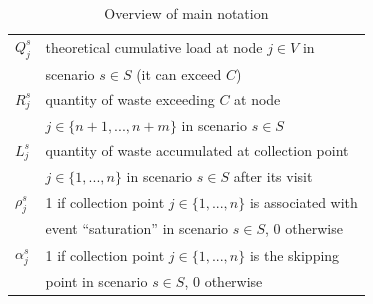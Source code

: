 \documentclass[preprint,11pt,authoryear]{elsarticle}
\begin{document}
\begin{table}[h!]
\begin{tabular}{ll}
$Q_j^s$ & theoretical cumulative load at node $j\in V$ in\\ & scenario $s \in S$ (it can exceed $C$)\\
$R_j^s$ & quantity of waste exceeding $C$ at node \\ & $j\in \{n+1,...,n+m\}$ in scenario $s \in S$\\
$L_j^s$ & quantity of waste accumulated at collection point \\ & $j\in \{1,...,n\}$ in scenario $s \in S$  after its visit \\
$\rho_j^s$ & 1 if collection point $j\in \{1,...,n\}$ is associated with \\ & event ``saturation'' in scenario $s\in S$, $0$ otherwise\\ 
$\alpha_j^s$ & 1 if collection point $j\in \{1,...,n\}$ is the skipping \\ & point in scenario $s\in S$, $0$ otherwise\\
\hline
		\end{tabular}
				\caption{Overview of main notation}
				\label{tab_notation}
	\end{table}
	
\end{document}
